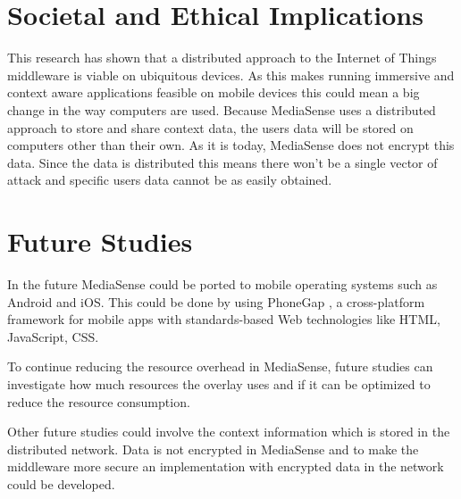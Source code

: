 \section{Societal and Ethical Implications}
This research has shown that a distributed approach to the Internet of Things middleware is viable on ubiquitous devices. As this makes running immersive and context aware applications feasible on mobile devices this could mean a big change in the way computers are used.
Because MediaSense uses a distributed approach to store and share context data, the users data will be stored on computers other than their own. As it is today, MediaSense does not encrypt this data. Since the data is distributed this means there won't be a single vector of attack and specific users data cannot be as easily obtained. 

\section{Future Studies}
In the future MediaSense could be ported to mobile operating systems such as Android and iOS. This could be done by using PhoneGap \cite{phonegap}, a cross-platform framework for mobile apps with standards-based Web technologies like HTML, JavaScript, CSS. 

To continue reducing the resource overhead in MediaSense, future studies can investigate how much resources the overlay uses and if it can be optimized to reduce the resource consumption. 

Other future studies could involve the context information which is stored in the distributed network. Data is not encrypted in MediaSense and to make the middleware more secure an implementation with encrypted data in the network could be developed.
